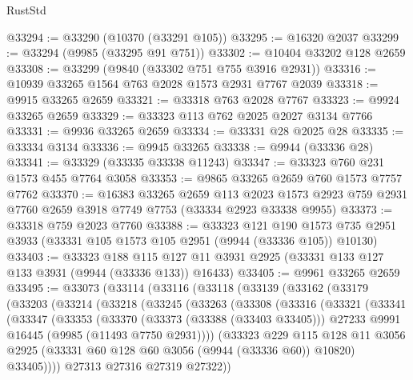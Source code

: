 \begin{lexlean}{RustStd}
\begin{coremodule}
@33294 := @33290 (@10370 (@33291 @105))
@33295 := @16320 @2037
@33299 := @33294 (@9985 (@33295 @91 @751))
@33302 := @10404 @33202 @128 @2659
@33308 := @33299 (@9840 (@33302 @751 @755 @3916 @2931))
@33316 := @10939 @33265 @1564 @763 @2028 @1573 @2931 @7767 @2039
@33318 := @9915 @33265 @2659
@33321 := @33318 @763 @2028 @7767
@33323 := @9924 @33265 @2659
@33329 := @33323 @113 @762 @2025 @2027 @3134 @7766
@33331 := @9936 @33265 @2659
@33334 := @33331 @28 @2025 @28
@33335 := @33334 @3134
@33336 := @9945 @33265
@33338 := @9944 (@33336 @28)
@33341 := @33329 (@33335 @33338 @11243)
@33347 := @33323 @760 @231 @1573 @455 @7764 @3058
@33353 := @9865 @33265 @2659 @760 @1573 @7757 @7762
@33370 := @16383
    @33265
    @2659
    @113
    @2023
    @1573
    @2923
    @759
    @2931
    @7760
    @2659
    @3918
    @7749
    @7753
    (@33334 @2923 @33338 @9955)
@33373 := @33318 @759 @2023 @7760
@33388 := @33323
    @121
    @190
    @1573
    @735
    @2951
    @3933
    (@33331 @105 @1573 @105 @2951 (@9944 (@33336 @105)) @10130)
@33403 := @33323
    @188
    @115
    @127
    @11
    @3931
    @2925
    (@33331 @133 @127 @133 @3931 (@9944 (@33336 @133)) @16433)
@33405 := @9961 @33265 @2659
@33495 := @33073
    (@33114
      (@33116
        (@33118
          (@33139
            (@33162
              (@33179
                (@33203
                  (@33214
                    (@33218
                      (@33245
                        (@33263
                          (@33308
                            (@33316
                              (@33321
                                (@33341
                                  (@33347
                                    (@33353
                                      (@33370
                                        (@33373 (@33388 (@33403 @33405)))
                                        @27233
                                        @9991
                                        @16445
                                        (@9985 (@11493 @7750 @2931))))
                                    (@33323
                                      @229
                                      @115
                                      @128
                                      @11
                                      @3056
                                      @2925
                                      (@33331 @60 @128 @60 @3056 (@9944 (@33336 @60)) @10820)
                                      @33405))))
                              @27313
                              @27316
                              @27319
                              @27322))

\end{coremodule}
\end{lexlean}

